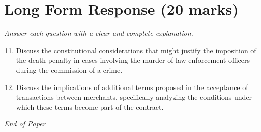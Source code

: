 \documentclass[12pt]{article}
\begin{document}
\section*{Long Form Response (20 marks)}
\textit{Answer each question with a clear and complete explanation.}
\begin{enumerate}[label=\arabic*.]
\setcounter{enumi}{10}
\item Discuss the constitutional considerations that might justify the imposition of the death penalty in cases involving the murder of law enforcement officers during the commission of a crime.
\item Discuss the implications of additional terms proposed in the acceptance of transactions between merchants, specifically analyzing the conditions under which these terms become part of the contract.
\end{enumerate}

\vfill
\noindent\textit{End of Paper}
\end{document}
